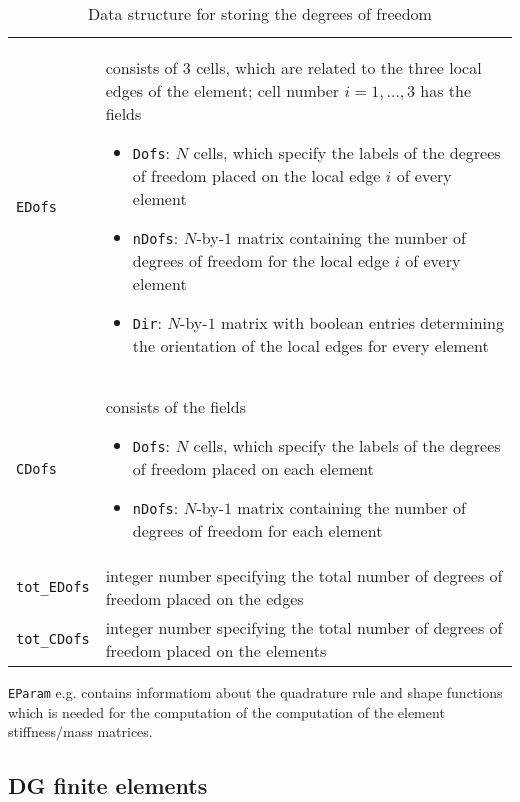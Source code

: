 \begin{table}[htb]
  \begin{tabular}{p{2cm}p{9cm}}
	{\tt EDofs} & {\small consists of 3 cells, which are related to the three local edges of the element; cell number $i=1,\ldots,3$ has the fields
	\begin{itemize}
	 \item {\tt Dofs}:  $N$ cells, which specify the labels of the degrees of freedom placed on the local edge $i$ of every element
	 \item {\tt nDofs}:  $N$-by-$1$ matrix containing the number of degrees of freedom for the local edge $i$ of every element
	 \item {\tt Dir}:  $N$-by-$1$ matrix with boolean entries determining the orientation of the local edges for every element
	\end{itemize}
	}\\
	{\tt CDofs} & {\small consists of the fields
	\begin{itemize}
	 \item {\tt Dofs}: $N$ cells, which specify the labels of the degrees of freedom placed on each element
	 \item {\tt nDofs}:  $N$-by-$1$ matrix containing the number of degrees of freedom for each element
	\end{itemize}
	} \\
	{\tt tot\_EDofs} & {\small integer number specifying the total number of degrees of freedom placed on the edges} \\
	{\tt tot\_CDofs} & {\small integer number specifying the total number of degrees of freedom placed on the elements}
  \end{tabular}
  \caption{Data structure for storing the degrees of freedom}
  \label{tab:elem2dof}
\end{table}

 {\tt EParam} e.g. contains informatiom about the quadrature rule and shape functions which is needed for the computation of the computation of the element stiffness/mass matrices.



\subsection{DG finite elements} \label{ssec:ddg}

